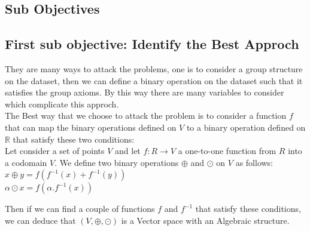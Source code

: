 \documentclass{report}
\begin{document}
    \subsection{Sub Objectives}
        \subsection*{First sub objective: Identify the Best Approch}
        
        They are many ways to attack the problems, one is to consider a group structure on the dataset, then we can define a binary operation on the dataset such that it satisfies the group axioms.
        By this way there are many variables to consider which complicate this approch.
        \\
        The Best way that we choose to attack the problem  is to consider a function $f$ that can map the binary operations defined on $V$ to a binary operation defined on $\mathbb{R}$ that satisfy these two conditions:
        \\
        Let consider a set of points  $ V $ and let  $ f: R \rightarrow V $ a one-to-one
        function from $R$ into a codomain $V$. We define two binary operations $\oplus$ and $\odot$ on $V$ as follows:
        $ x \oplus y = f(f^{-1}(x) + f^{-1}(y)) $
        \\
        $ \alpha \odot x = f(  \alpha.f^{-1}(x)) $


        Then if we can find a couple of functions $f$ and $f^{-1}$ that satisfy these conditions, we can deduce that $(V, \oplus, \odot)$ is a Vector space with an Algebraic structure.
        
        
\end{document}
